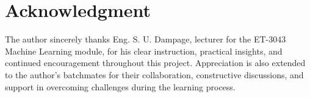 \documentclass[conference,a4paper]{IEEEtran}
\begin{document}
\section*{Acknowledgment}
The author sincerely thanks Eng. S. U. Dampage, lecturer for the ET-3043 Machine Learning module, for his clear instruction, practical insights, and continued encouragement throughout this project. Appreciation is also extended to the author's batchmates for their collaboration, constructive discussions, and support in overcoming challenges during the learning process.



\end{document}
